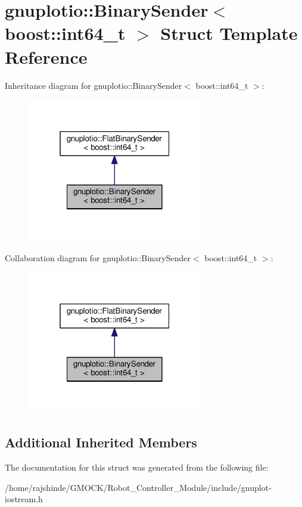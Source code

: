 \hypertarget{structgnuplotio_1_1_binary_sender_3_01boost_1_1int64__t_01_4}{}\section{gnuplotio\+:\+:Binary\+Sender$<$ boost\+:\+:int64\+\_\+t $>$ Struct Template Reference}
\label{structgnuplotio_1_1_binary_sender_3_01boost_1_1int64__t_01_4}


Inheritance diagram for gnuplotio\+:\+:Binary\+Sender$<$ boost\+:\+:int64\+\_\+t $>$\+:
\nopagebreak
\begin{figure}[H]
\begin{center}
\leavevmode
\includegraphics[width=217pt]{structgnuplotio_1_1_binary_sender_3_01boost_1_1int64__t_01_4__inherit__graph}
\end{center}
\end{figure}


Collaboration diagram for gnuplotio\+:\+:Binary\+Sender$<$ boost\+:\+:int64\+\_\+t $>$\+:
\nopagebreak
\begin{figure}[H]
\begin{center}
\leavevmode
\includegraphics[width=217pt]{structgnuplotio_1_1_binary_sender_3_01boost_1_1int64__t_01_4__coll__graph}
\end{center}
\end{figure}
\subsection*{Additional Inherited Members}


The documentation for this struct was generated from the following file\+:\begin{DoxyCompactItemize}
\item 
/home/rajshinde/\+G\+M\+O\+C\+K/\+Robot\+\_\+\+Controller\+\_\+\+Module/include/gnuplot-\/iostream.\+h\end{DoxyCompactItemize}
